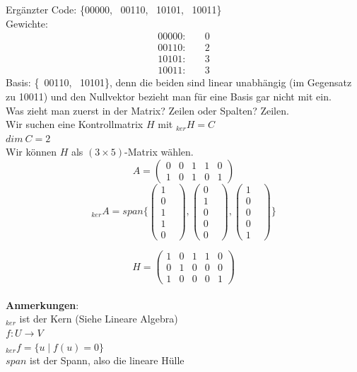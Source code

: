 \documentclass{article} %
\begin{document}
\begin{mybox}
Ergänzter Code: \{00000, \ 00110, \ 10101, \ 10011\}\\
Gewichte: 
\begin{align*}
    00000: & \quad 0\\
    00110: & \quad 2\\
    10101: & \quad 3\\
    10011: & \quad 3
\end{align*}
Basis: \{\ 00110, \ 10101\}, denn die beiden sind linear unabhängig (im Gegensatz zu 10011) und den Nullvektor bezieht man für eine Basis gar nicht mit ein. \\
Was zieht man zuerst in der Matrix? Zeilen oder Spalten? Zeilen. \\ 

Wir suchen eine Kontrollmatrix $H$ mit $_{ker}H = C$ \\
$dim\ C = 2$ \\
Wir können $H$ als $(3\times 5)$-Matrix wählen. 
\begin{equation*}
    A = \begin{pmatrix}
0 & 0 & 1 & 1 & 0 \\
1 & 0 & 1 & 0 & 1
\end{pmatrix}
\end{equation*}
\begin{equation*}
    _{ker}A = span \{ 
    \begin{pmatrix}
    1 & \\ 0 & \\ 1 & \\ 1 & \\ 0 
    \end{pmatrix}, 
    \begin{pmatrix}
    0 & \\ 1 & \\ 0 & \\ 0 & \\ 0
    \end{pmatrix}, 
    \begin{pmatrix}
    1 & \\ 0 & \\ 0 & \\ 0 & \\ 1
    \end{pmatrix}
    \}
\end{equation*}

\begin{equation*}
    H = \begin{pmatrix}
    1&0&1&1&0 \\
    0&1&0&0&0 \\
    1&0&0&0&1 
    \end{pmatrix}
\end{equation*} \\
\textbf{Anmerkungen}:\\
$_{ker}$ ist der Kern (Siehe Lineare Algebra)\\
$f: U \rightarrow V$ \\
$_{ker}f = \{u \mid f(u) = 0\}$ \\ \newline
$span$ ist der Spann, also die lineare Hülle 
\end{mybox}
\end{document}
